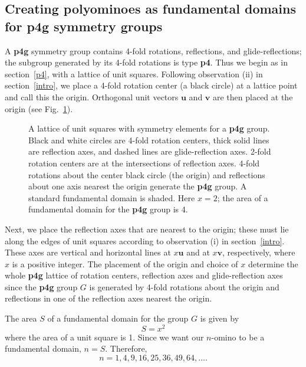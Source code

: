 \documentclass{ws-ijcga}
\begin{document}
\subsection{Creating polyominoes as fundamental domains for {\bf p4g} symmetry groups}
\label{p4gcre}
A {\bf p4g} symmetry group contains 4-fold rotations, reflections, and glide-reflections; the
subgroup generated by its 4-fold rotations is type {\bf p4}. 
Thus we begin as in section~\ref{p4},
with a lattice of unit squares. 
Following observation (ii) in section~\ref{intro}, 
we place a 4-fold rotation center (a black circle) at a lattice point and call this the origin. 
Orthogonal unit vectors $\mathbf u$ and $\mathbf v$ are then placed at the origin (see Fig.~\ref{fig:p4glattice}).
\begin{figure}[h]
\centerline{}
\caption{
A lattice of unit squares with symmetry elements for a {\bf p4g} group. 
Black and white circles are 4-fold rotation centers, thick solid lines are reflection axes, 
and dashed lines are glide-reflection axes. 2-fold
rotation centers are at the intersections of reflection axes. 
4-fold rotations about the center black circle (the
origin) and reflections about one axis nearest the origin generate the {\bf p4g} group. 
A standard fundamental
domain is shaded. Here $x = 2$; the area of a fundamental domain for the {\bf p4g} group is 4.
\label{fig:p4glattice}
}
\end{figure}

Next, we place the reflection axes that are nearest to the origin; 
these must lie along the edges of unit squares according to observation (i) in section~\ref{intro}. 
These axes are vertical and horizontal lines at $x{\mathbf u}$ and at $x{\mathbf v}$, respectively, 
where $x$ is a positive integer. 
The placement of the origin and choice of $x$ determine the whole {\bf p4g} lattice of rotation
centers, reflection axes and glide-reflection axes since the {\bf p4g} group $G$ is generated 
by 4-fold rotations about the origin and reflections in one of the reflection axes nearest the
origin.

The area $S$ of a fundamental domain for the group $G$ is given by
\begin{equation}
S=x^2
\end{equation}  
where the area of a unit square is 1. Since we want our $n$-omino to be a fundamental
domain, $n = S$. Therefore,
\begin{equation}
n=1, 4, 9, 16, 25, 36, 49, 64, \ldots.
\label{p4g:n}
\end{equation}  
\end{document}
